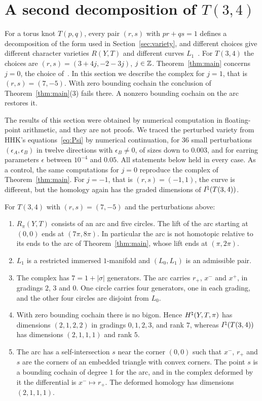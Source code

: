 \section{A second decomposition of \texorpdfstring{$T(3,4)$}{T(3,4)}}\label{sec:other}

For a torus knot $T(p,q)$, every pair $(r,s)$ with $pr+qs=1$ defines a decomposition of the form used in
Section~\ref{sec:variety}, and different choices give different character varieties $R(Y,T)$ and different
curves $L_1$~\cite[\S11]{HHK2}. For $T(3,4)$ the choices are $(r,s)=(3+4j,-2-3j)$, $j\in\mathbb{Z}$. Theorem~\ref{thm:main}
concerns $j=0$, the choice of~\cite[\S11.6]{HHK2}. In this section we describe the complex for $j=1$, that is
$(r,s)=(7,-5)$. With zero bounding cochain the conclusion of Theorem~\ref{thm:main}(3) fails there. A nonzero
bounding cochain on the arc restores it.

The results of this section were obtained by numerical computation in floating-point arithmetic, and they are
not proofs. We traced the perturbed variety from HHK's equations~\eqref{eq:Psi} by numerical continuation, for
$36$ small perturbations $(\epsilon_A,\epsilon_B)$ in twelve directions with $\epsilon_B\neq0$, of sizes down to $0.003$, and
for earring parameters $\epsilon$ between $10^{-4}$ and $0.05$. All statements below held in every case. As a
control, the same computations for $j=0$ reproduce the complex of Theorem~\ref{thm:main}. For $j=-1$, that is
$(r,s)=(-1,1)$, the curve is different, but the homology again has the graded dimensions of $I^{\natural}(T(3,4))$.

\begin{proposition}[numerical]\label{prop:other}
For $T(3,4)$ with $(r,s)=(7,-5)$ and the perturbations above:
\begin{enumerate}
\item $R_\pi(Y,T)$ consists of an arc and five circles. The lift of the arc starting at $(0,0)$ ends at
$(7\pi,8\pi)$. In particular the arc is not homotopic relative to its ends to the arc of Theorem~\ref{thm:main},
whose lift ends at $(\pi,2\pi)$.
\item $L_1$ is a restricted immersed $1$-manifold and $(L_0,L_1)$ is an admissible pair.
\item The complex has $7=1+|\sigma|$ generators. The arc carries $r_+$, $x^-$ and $x^+$, in gradings $2$, $3$ and $0$.
One circle carries four generators, one in each grading, and the other four circles are disjoint from $L_0$.
\item With zero bounding cochain there is no bigon. Hence $H^{\natural}(Y,T,\pi)$ has dimensions $(2,1,2,2)$ in gradings
$0,1,2,3$, and rank $7$, whereas $I^{\natural}(T(3,4))$ has dimensions $(2,1,1,1)$ and rank $5$.
\item The arc has a self-intersection $s$ near the corner $(0,0)$ such that $x^-$, $r_+$ and $s$ are the corners of
an embedded triangle with convex corners. The point $s$ is a bounding cochain of degree $1$ for the arc, and
in the complex deformed by it the differential is $x^-\mapsto r_+$. The deformed homology has dimensions
$(2,1,1,1)$.
\end{enumerate}
\end{proposition}

